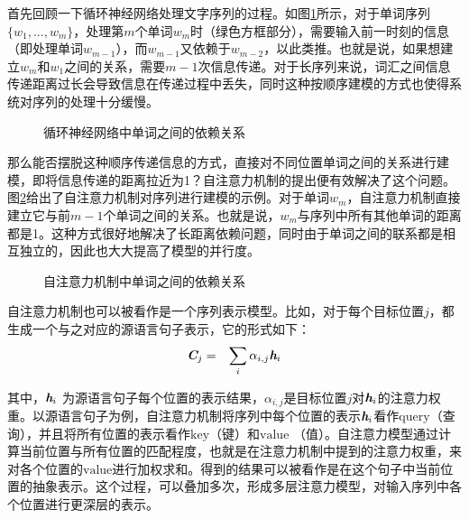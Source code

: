 \parinterval 首先回顾一下循环神经网络处理文字序列的过程。如图\ref{fig:12-1}所示，对于单词序列$\{ w_1,...,w_m \}$，处理第$m$个单词$w_m$时（绿色方框部分），需要输入前一时刻的信息（即处理单词$w_{m-1}$），而$w_{m-1}$又依赖于$w_{m-2}$，以此类推。也就是说，如果想建立$w_m$和$w_1$之间的关系，需要$m-1$次信息传递。对于长序列来说，词汇之间信息传递距离过长会导致信息在传递过程中丢失，同时这种按顺序建模的方式也使得系统对序列的处理十分缓慢。

\begin{figure}[htp]
\centering

\caption{循环神经网络中单词之间的依赖关系}
\label{fig:12-1}
\end{figure}

\parinterval 那么能否摆脱这种顺序传递信息的方式，直接对不同位置单词之间的关系进行建模，即将信息传递的距离拉近为1？自注意力机制的提出便有效解决了这个问题。图\ref{fig:12-2}给出了自注意力机制对序列进行建模的示例。对于单词$w_m$，自注意力机制直接建立它与前$m-1$个单词之间的关系。也就是说，$w_m$与序列中所有其他单词的距离都是1。这种方式很好地解决了长距离依赖问题，同时由于单词之间的联系都是相互独立的，因此也大大提高了模型的并行度。

\begin{figure}[htp]
\centering

\caption{自注意力机制中单词之间的依赖关系}
\label{fig:12-2}
\end{figure}

\parinterval 自注意力机制也可以被看作是一个序列表示模型。比如，对于每个目标位置$j$，都生成一个与之对应的源语言句子表示，它的形式如下：
\begin{eqnarray}
\textbf{\em C}_j & = & \sum_i \alpha_{i,j}\textbf{\em h}_i
\label{eq:12-1}
\end{eqnarray}

\noindent 其中，$\textbf{\em h}_i$ 为源语言句子每个位置的表示结果，$\alpha_{i,j}$是目标位置$j$对$\textbf{\em h}_i$的注意力权重。以源语言句子为例，自注意力机制将序列中每个位置的表示$\textbf{\em h}_i$看作$\mathrm{query}$（查询），并且将所有位置的表示看作$\mathrm{key}$（键）和$\mathrm{value}$ （值）。自注意力模型通过计算当前位置与所有位置的匹配程度，也就是在注意力机制中提到的注意力权重，来对各个位置的$\mathrm{value}$进行加权求和。得到的结果可以被看作是在这个句子中当前位置的抽象表示。这个过程，可以叠加多次，形成多层注意力模型，对输入序列中各个位置进行更深层的表示。

